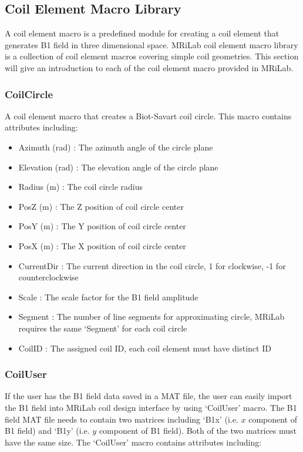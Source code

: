 \documentclass{book}%
\begin{document}
\subsection{Coil Element Macro Library}

A coil element macro is a predefined module for creating a coil element that generates B1 field in three dimensional space. MRiLab coil element macro library is a collection of coil element macros covering simple coil geometries. This section will give an introduction to each of the coil element macro provided in MRiLab.

\subsubsection{CoilCircle}

A coil element macro that creates a Biot-Savart coil circle. This macro contains attributes including:

\begin{itemize}
	\item Azimuth (rad) : The azimuth angle of the circle plane
	\item Elevation (rad) : The elevation angle of the circle plane
	\item Radius (m) : The coil circle radius
	\item PosZ (m) : The Z position of coil circle center
  \item PosY (m) : The Y position of coil circle center
	\item PosX (m) : The X position of coil circle center
	\item CurrentDir : The current direction in the coil circle, 1 for clockwise, -1 for counterclockwise
	\item Scale : The scale factor for the B1 field amplitude
	\item Segment : The number of line segments for approximating circle, MRiLab requires the same `Segment' for each coil circle
	\item CoilID : The assigned coil ID, each coil element must have distinct ID
\end{itemize}

\subsubsection{CoilUser}

If the user has the B1 field data saved in a MAT file, the user can easily import the B1 field into MRiLab coil design interface by using `CoilUser' macro. The B1 field MAT file needs to contain two matrices including `B1x' (i.e. $x$ component of B1 field) and `B1y' (i.e. $y$ component of B1 field). Both of the two matrices must have the same size. The `CoilUser' macro contains attributes including:
\end{document}
